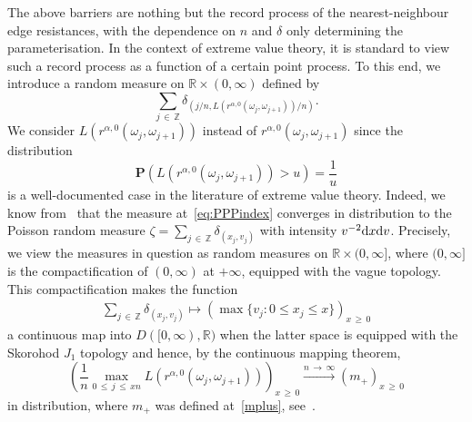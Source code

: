 \documentclass[10pt]{amsart}
\theoremstyle{definition}\newtheorem{defi}[theo]{Definition}\newtheorem{rema}[theo]{Remark}\newtheorem{exam}[theo]{Example}\newtheorem{exem}[theo]{Example}\newtheorem{nota}[theo]{Notation}
\newcommand{\Z}{\mathbb Z}
\newcommand{\R}{\mathbb R}
\newcommand{\bfP}{\mathbf{P}}
\newcommand{\dd}{\text{\upshape{d}}}
\begin{document}
The above barriers are nothing but the record process of the nearest-neighbour edge resistances, with the dependence on $n$ and $\delta$ only determining the parameterisation. In the context of extreme value theory, it is standard to view such a record process as a function of a certain point process. To this end, we introduce a random measure on $\R\times (0,\infty)$ defined by
\begin{equation}\label{eq:PPPindex}
\sum_{j\,\in\,\Z}\delta_{\left(j/n, L\left(r^{\alpha,0}\left(\omega_j,\omega_{j+1}\right)\right)/n\right)}.
\end{equation}
We consider $L(r^{\alpha,0}(\omega_j,\omega_{j+1}))$ instead of $r^{\alpha,0}(\omega_j,\omega_{j+1})$ since the distribution
\begin{equation}\label{ltail}
\bfP\left(L\left(r^{\alpha,0}\left(\omega_j,\omega_{j+1}\right)\right)>u\right)=\frac{1}{u}
\end{equation}
is a well-documented case in the literature of extreme value theory. Indeed, we know from~\cite[Corollary~4.19]{Res87} that the measure at~\eqref{eq:PPPindex} converges in distribution to the Poisson random measure $\zeta=\sum_{j\,\in\,\Z} \delta_{(x_j, v_j)}$ with intensity $v^{-2}\dd x \dd v$. Precisely, we view the measures in question as random measures on $\R \times (0,\infty]$, where $(0,\infty]$ is the compactification of $(0,\infty)$ at $+\infty$, equipped with the vague topology. This compactification makes the function
\begin{align*}
\sum_{j\,\in\,\Z} \delta_{\left(x_j, v_j\right)}\mapsto \left(\max\{v_j\colon 0\le x_j \le x\}\right)_{x\,\geq\,0}
\end{align*}
a continuous map into $D([0,\infty),\R)$ when the latter space is equipped with the Skorohod $J_1$ topology and hence, by the continuous mapping theorem,
\[
\left(\frac{1}{n} \max_{0\,\le\,j\,\le\,xn} L\left(r^{\alpha,0}\left(\omega_j,\omega_{j+1}\right)\right) \right)_{x\,\geq\,0}\xrightarrow{n\,\to\,\infty} (m_+)_{x\,\geq\,0}
\]
in distribution, where $m_+$ was defined at~\eqref{mplus}, see~\cite[Proposition~4.20]{Res87}.
\end{document}

